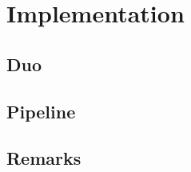 \chapter{Implementation}
\label{ch:implementation}

\section{Duo}



\section{Pipeline}


\section{Remarks}

